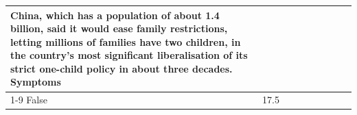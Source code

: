\begin{table}[H]
\begin{tabular}{lllrlllll}
China, which has a population of about 1.4 billion, said it would ease family restrictions, letting millions of families have two children, in the country's most significant liberalisation of its strict one-child policy in about three decades. Symptoms \\
\cline{1-9}
False & 17.5%
\end{tabular}
\end{table}

